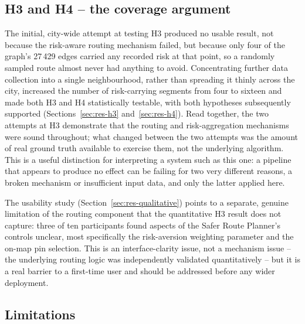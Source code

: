 \documentclass[10pt,a4paper,twocolumn]{article}
\begin{document}
\subsection{H3 and H4 -- the coverage argument}
\label{sec:disc-h3-h4}

The initial, city-wide attempt at testing H3 produced no usable result,
not because the risk-aware routing mechanism failed, but because only
four of the graph's 27\,429 edges carried any recorded risk at that
point, so a randomly sampled route almost never had anything to avoid.
Concentrating further data collection into a single neighbourhood,
rather than spreading it thinly across the city, increased the number of
risk-carrying segments from four to sixteen and made both H3 and H4
statistically testable, with both hypotheses subsequently supported
(Sections~\ref{sec:res-h3} and~\ref{sec:res-h4}). Read together, the two
attempts at H3 demonstrate that the routing and risk-aggregation
mechanisms were sound throughout; what changed between the two attempts
was the amount of real ground truth available to exercise them, not the
underlying algorithm. This is a useful distinction for interpreting a
system such as this one: a pipeline that appears to produce no effect can
be failing for two very different reasons, a broken mechanism or
insufficient input data, and only the latter applied here.

The usability study (Section~\ref{sec:res-qualitative}) points to a
separate, genuine limitation of the routing component that the
quantitative H3 result does not capture: three of ten participants
found aspects of the Safer Route Planner's controls unclear, most
specifically the risk-aversion weighting parameter and the on-map pin
selection. This is an interface-clarity issue, not a mechanism issue --
the underlying routing logic was independently validated
quantitatively -- but it is a real barrier to a first-time user and
should be addressed before any wider deployment.

\subsection{Limitations}
\label{sec:disc-limitations}
\end{document}
